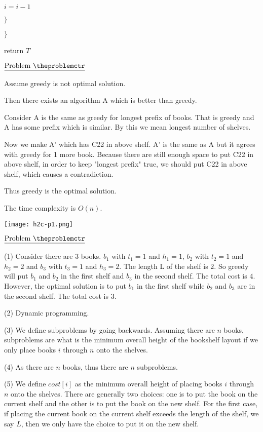 \documentclass[11pt]{article}
\def\pp{\par\noindent}
\begin{document}
\hspace{1 cm} $i = i-1$

\hspace{.5 cm} $\}$

$\}$

return $T$

\vfill
\newpage

\addtocounter{problemctr}{1}
\bigskip
\noindent
$\underline{\rm Problem\ \theproblemctr}$ \pp
\noindent
Assume greedy is not optimal solution. 

Then there exists an algorithm A which is better than greedy.

Consider A is the same as greedy for longest prefix of books. That is greedy and A has some prefix which is similar. By this we mean longest number of shelves.

Now we make A' which has C22 in above shelf. A' is the same as A but it agrees with greedy for 1 more book. Because there are still enough space to put C22 in above shelf, in order to keep "longest prefix" true, we should put C22 in above shelf, which causes a contradiction.

Thus greedy is the optimal solution.

The time complexity is $O(n)$.

\bigskip
\texttt{[image: h2c-p1.png]}

\vfill
\newpage
\addtocounter{problemctr}{1}
\bigskip
\noindent
$\underline{\rm Problem\ \theproblemctr}$\pp
\noindent
(1) Consider there are $3$ books. $b_1$ with $t_1 = 1$ and $h_1=1$, $b_2$ with $t_2 = 1$ and $h_2 = 2$ and $b_3$ with $t_3 = 1$ and $h_3 = 2$. The length L of the shelf is $2$. So greedy will put $b_1$ and $b_2$ in the first shelf and $b_3$ in the second shelf. The total cost is $4$. However, the optimal solution is to put $b_1$ in the first shelf while $b_2$ and $b_3$ are in the second shelf. The total cost is $3$.  

\bigskip
\bigskip
\noindent
(2) Dynamic programming.

\bigskip
\bigskip
\noindent
(3) We define subproblems by going backwards. Assuming there are $n$ books, subproblems are what is the minimum overall height of the bookshelf layout if we only place books $i$ through $n$ onto the shelves.

\bigskip
\bigskip
\noindent
(4) As there are $n$ books, thus there are $n$ subproblems.

\bigskip
\bigskip
\noindent
(5) We define $cost[i]$ as the minimum overall height of placing books $i$ through $n$ onto the shelves. There are generally two choices: one is to put the book on the current shelf and the other is to put the book on the new shelf. For the first case, if placing the current book on the current shelf exceeds the length of the shelf, we say $L$, then we only have the choice to put it on the new shelf.
\end{document}
